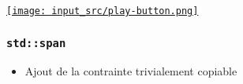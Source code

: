 \documentclass[C++.tex]{subfiles}
\begin{document}
\begin{frame}[fragile]
	\hfill
	\href{https://godbolt.org/#g:!((g:!((g:!((h:codeEditor,i:(filename:'1',fontScale:14,fontUsePx:'0',j:1,lang:c%2B%2B,selection:(endColumn:1,endLineNumber:20,positionColumn:1,positionLineNumber:20,selectionStartColumn:1,selectionStartLineNumber:1,startColumn:1,startLineNumber:1),source:'%23include+%3Ciostream%3E%0A%23include+%3Cstring%3E%0A%23include+%3Calgorithm%3E%0A%23include+%3Ccstring%3E%0A%0Aint+main()%0A%7B%0A++std::string+foo+%3D+%22Hello+%22%3B%0A++std::string+bar+%3D+%22world!!%22%3B%0A%0A++foo.resize_and_overwrite(20,+%0A++++++++++++++++++++++++++%5Bsz+%3D+foo.size(),+bar%5D+(char*+buf,+size_t+buf_size)+%0A++++++++++++++++++++++++++%7B%0A++++++++++++++++++++++++++++auto+to_copy+%3D+std::min(buf_size+-+sz,+bar.size())%3B%0A++++++++++++++++++++++++++++memcpy(buf+%2B+sz,+bar.data(),+to_copy)%3B%0A++++++++++++++++++++++++++++return+sz+%2B+to_copy%3B+%7D)%3B%0A%0A++std::cout+%3C%3C+foo++%3C%3C+%22%5Cn%22%3B%0A%7D%0A'),l:'5',n:'0',o:'C%2B%2B+source+%231',t:'0')),k:50,l:'4',n:'0',o:'',s:0,t:'0'),(g:!((h:executor,i:(argsPanelShown:'1',compilationPanelShown:'0',compiler:g122,compilerName:'',compilerOutShown:'0',execArgs:'',execStdin:'',fontScale:14,fontUsePx:'0',j:1,lang:c%2B%2B,libs:!((name:boost,ver:'175')),options:'-std%3Dc%2B%2B23+-Wall+-Wextra+-pedantic',source:1,stdinPanelShown:'1',tree:'1',wrap:'0'),l:'5',n:'0',o:'Executor+x86-64+gcc+12.2+(C%2B%2B,+Editor+%231)',t:'0')),header:(),k:50,l:'4',n:'0',o:'',s:0,t:'0')),l:'2',n:'0',o:'',t:'0')),version:4}{\texttt{[image: input\_src/play-button.png]}}
\end{frame}

\begin{frame}[fragile]
	\frametitle{\lstinline|std::span|}
	\begin{itemize}
		\item Ajout de la contrainte trivialement copiable
	\end{itemize}
\end{frame}
\end{document}
